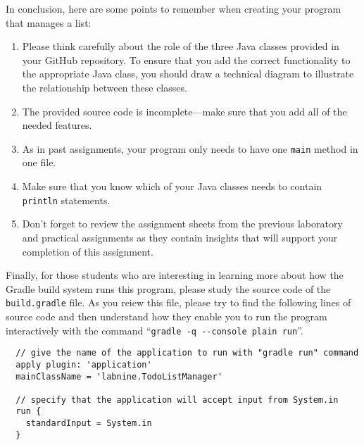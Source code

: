 \documentclass[11pt]{article}
\newcommand{\command}[1]{``\lstinline{#1}''}
\newcommand{\program}[1]{\lstinline{#1}}
\begin{document}
\noindent
In conclusion, here are some points to remember when creating your program that manages a list:

\begin{enumerate}
  \setlength{\itemsep}{0pt}

\item Please think carefully about the role of the three Java classes provided
  in your GitHub repository. To ensure that you add the correct functionality to
  the appropriate Java class, you should draw a technical diagram to illustrate
  the relationship between these classes.

\item The provided source code is incomplete---make sure that you add all of the
  needed features.

\item As in past assignments, your program only needs to have one {\tt main}
  method in one file.

\item Make sure that you know which of your Java classes needs to contain {\tt
  println} statements.

\item Don't forget to review the assignment sheets from the previous laboratory
  and practical assignments as they contain insights that will support your
  completion of this assignment.



\end{enumerate}

Finally, for those students who are interesting in learning more about how the
Gradle build system runs this program, please study the source code of the
\program{build.gradle} file. As you reiew this file, please try to find the
following lines of source code and then understand how they enable you to run
the program interactively with the command \command{gradle -q --console plain
run}.

\begin{verbatim}
  // give the name of the application to run with "gradle run" command
  apply plugin: 'application'
  mainClassName = 'labnine.TodoListManager'

  // specify that the application will accept input from System.in
  run {
    standardInput = System.in
  }
\end{verbatim}
\end{document}
